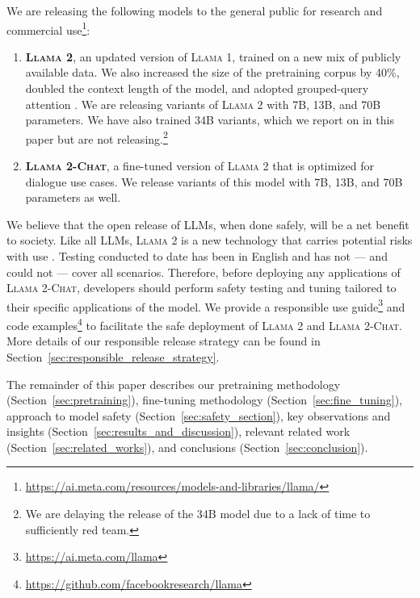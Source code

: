 \documentclass{article}
\newcommand{\modelname}{\textsc{Llama 2-Chat}\xspace}
\newcommand{\anise}{\textsc{Llama 1}\xspace}
\newcommand{\cinnamon}{\textsc{Llama 2}\xspace}
\begin{document}
We are releasing the following models to the general public for research and commercial use\footnote{\url{https://ai.meta.com/resources/models-and-libraries/llama/}}:
\begin{enumerate}
  \item \textbf{\cinnamon{}}, an updated version of \anise{}, trained on a new mix of publicly available data. We also increased the size of the pretraining corpus by 40\%, doubled the context length of the model, and adopted grouped-query attention \citep{gqa2023}. We are releasing variants of \cinnamon with 7B, 13B, and 70B parameters. We have also trained 34B variants, which we report on in this paper but are not releasing.\footnote{We are delaying the release of the 34B model due to a lack of time to sufficiently red team.}

  \item \textbf{\modelname{}}, a fine-tuned version of \cinnamon{} that is optimized for dialogue use cases. We release variants of this model with 7B, 13B, and 70B parameters as well.
\end{enumerate}

We believe that the open release of LLMs, when done safely, will be a net benefit to society. Like all LLMs, \cinnamon is a new technology that carries potential risks with use \citep{bender2021dangers,weidinger2021ethical,solaiman2023evaluating}. Testing conducted to date has  been in English and has not — and could not — cover all scenarios.  Therefore, before deploying any applications of \modelname{}, developers should perform safety testing and tuning tailored to their specific applications of the model. We provide a responsible use guide\footnote{\url{https://ai.meta.com/llama}} and code examples\footnote{\url{https://github.com/facebookresearch/llama}} to facilitate the safe deployment of \cinnamon and \modelname. More details of our responsible release strategy can be found in Section~\ref{sec:responsible_release_strategy}.



The remainder of this paper describes our pretraining methodology (Section~\ref{sec:pretraining}), fine-tuning methodology (Section~\ref{sec:fine_tuning}),  approach to model safety (Section~\ref{sec:safety_section}), key observations and insights (Section~\ref{sec:results_and_discussion}), relevant related work (Section~\ref{sec:related_works}), and  conclusions (Section~\ref{sec:conclusion}).    
\end{document}
